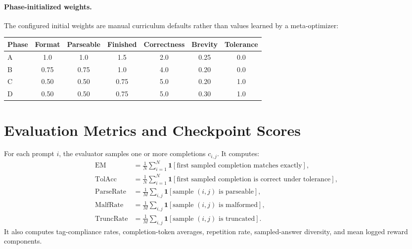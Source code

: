 \documentclass{article} %
\begin{document}
\paragraph{Phase-initialized weights.}
The configured initial weights are manual curriculum defaults rather than values learned by a meta-optimizer:
\begin{center}
\small
\begin{tabular}{lcccccc}
\toprule
Phase & Format & Parseable & Finished & Correctness & Brevity & Tolerance \\
\midrule
A & 1.0 & 1.0 & 1.5 & 2.0 & 0.25 & 0.0 \\
B & 0.75 & 0.75 & 1.0 & 4.0 & 0.20 & 0.0 \\
C & 0.50 & 0.50 & 0.75 & 5.0 & 0.20 & 1.0 \\
D & 0.50 & 0.50 & 0.75 & 5.0 & 0.30 & 1.0 \\
\bottomrule
\end{tabular}
\end{center}

\section{Evaluation Metrics and Checkpoint Scores}

For each prompt $i$, the evaluator samples one or more completions $c_{i,j}$. It computes:
\begin{align}
\mathrm{EM} &= \frac{1}{N}\sum_{i=1}^N \mathbf{1}[\text{first sampled completion matches exactly}],\\
\mathrm{TolAcc} &= \frac{1}{N}\sum_{i=1}^N \mathbf{1}[\text{first sampled completion is correct under tolerance}],\\
\mathrm{ParseRate} &= \frac{1}{M}\sum_{i,j}\mathbf{1}[\text{sample } (i,j) \text{ is parseable}],\\
\mathrm{MalfRate} &= \frac{1}{M}\sum_{i,j}\mathbf{1}[\text{sample } (i,j) \text{ is malformed}],\\
\mathrm{TruncRate} &= \frac{1}{M}\sum_{i,j}\mathbf{1}[\text{sample } (i,j) \text{ is truncated}].
\end{align}
It also computes tag-compliance rates, completion-token averages, repetition rate, sampled-answer diversity, and mean logged reward components.
\end{document}
